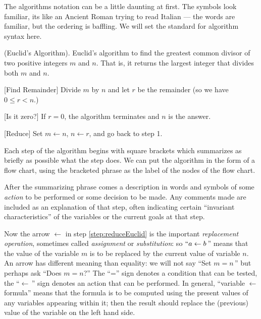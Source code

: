 
The algorithms notation can be a little daunting at first. The
symbols look familiar, its like an Ancient Roman trying to
read Italian --- the words are familiar, but the ordering is
baffling. We will set the standard for algorithm syntax here.

\summary (Euclid's Algorithm). {Euclid's algorithm to find the greatest common 
divisor of two positive integers $m$ and $n$. That is, it returns the
largest integer that divides both $m$ and $n$. \label{alg:euclidAlgorithm}}
\begin{algorithm}
\item {[Find Remainder]} Divide $m$ by $n$ and let $r$ be the
remainder (so we have $0\leq r<n$.)
\item {[Is it zero?]} If $r=0$, the algorithm terminates and $n$ is
the answer.
\item {[Reduce]} Set $m\gets n$, $n\gets r$, and go back to step
1. \label{step:reduceEuclid}
\end{algorithm}
\noindent{}\noindent Each step of the algorithm begins with square brackets
which summarizes as briefly as possible what the step does. We
can put the algorithm in the form of a flow chart, using the
bracketed phrase as the label of the nodes of the flow chart.

After
the summarizing phrase comes a description in words and symbols
of some \emph{action} to be performed or some decision to be
made. Any comments made are included as an explanation of that
step, often indicating certain ``invariant characteristics'' of
the variables or the current goals at that step.

Now
the arrow $\gets$ in step \ref{step:reduceEuclid}
is the important \emph{replacement operation}, sometimes
called \emph{assignment} or \emph{substitution}: so $``a\gets
b\,$'' means that the value of the variable $m$ is to be replaced
by the current value of variable $n$. An arrow has different
meaning than equality: we will not say ``Set $m=n\,$'' but
perhaps ask ``Does $m=n$?'' The ``='' sign denotes a condition
that can be tested, the ``$\gets\,$'' sign denotes an action that
can be performed. In general, ``variable $\gets$ formula'' means
that the formula is to be computed using the present values of
any variables appearing within it; then the result should replace
the (previous) value of the variable on the left hand side. 

